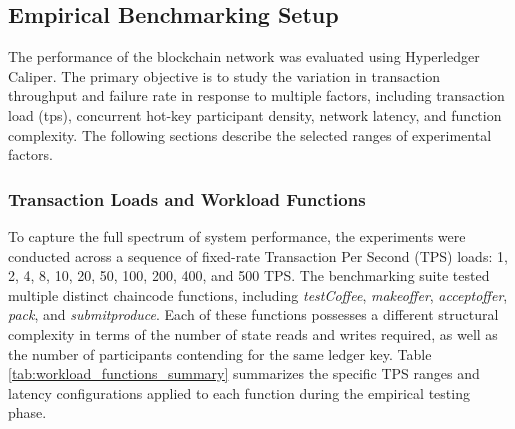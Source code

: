 ﻿\documentclass[12pt]{article}
\begin{document}
\subsection{Empirical Benchmarking Setup}



The performance of the blockchain network was evaluated using Hyperledger Caliper. The primary objective is to study the variation in transaction throughput and failure rate in response to multiple factors, including transaction load (tps), concurrent hot-key participant density, network latency, and function complexity. The following sections describe the selected ranges of experimental factors.

\subsubsection{Transaction Loads and Workload Functions}
To capture the full spectrum of system performance, the experiments were conducted across a sequence of fixed-rate Transaction Per Second (TPS) loads: 1, 2, 4, 8, 10, 20, 50, 100, 200, 400, and 500 TPS. The benchmarking suite tested multiple distinct chaincode functions, including \textit{testCoffee}, \textit{makeoffer}, \textit{acceptoffer}, \textit{pack}, and \textit{submitproduce}. Each of these functions possesses a different structural complexity in terms of the number of state reads and writes required, as well as the number of participants contending for the same ledger key. Table \ref{tab:workload_functions_summary} summarizes the specific TPS ranges and latency configurations applied to each function during the empirical testing phase.

\begin{table}[H]
\centering
\caption{Summary of Workload Functions and Empirical Testing Parameters}
\label{tab:workload_functions_summary}
\end{table}
\end{document}
